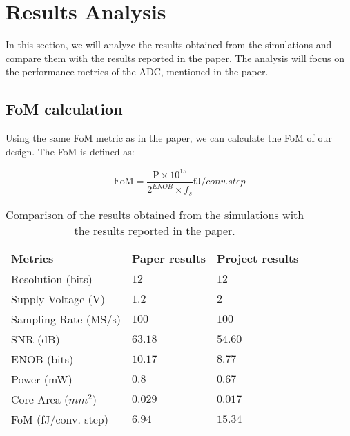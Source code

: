 \section{Results Analysis}
\label{sec:results}

In this section, we will analyze the results obtained from the simulations and compare them with the results reported in the paper. The analysis will focus on the performance metrics of the ADC, mentioned in the paper.

\subsection{FoM calculation}

Using the same FoM metric as in the paper, we can calculate the FoM of our design. The FoM is defined as:

\begin{equation}
    \text{FoM} = \frac{\text{P} \times 10^{15}}{2^{ENOB} \times f_s } \si{\femto \joule \per conv.step}
    \label{eq:FoM}
\end{equation}

\begin{table}[h]
    \centering
    \caption{Comparison of the results obtained from the simulations with the results reported in the paper.}
    \begin{tabularx}{\textwidth}{>{\centering\arraybackslash}X >{\centering\arraybackslash}X >{\centering\arraybackslash}X }
        \toprule
        \textbf{Metrics} & \textbf{Paper results} & \textbf{Project results}\\
        \midrule
        Resolution (bits) & $12$ & $12$ \\
        \midrule
        Supply Voltage (V) & $1.2$ & $2$ \\
        \midrule
        Sampling Rate (MS/s) & $100$ & $100$  \\
        \midrule
        SNR (dB) & $63.18$ & $54.60$ \\
        \midrule
        ENOB (bits) & $10.17$ & $8.77$ \\
        \midrule
        Power (mW) & $0.8$ & $0.67$   \\
        \midrule
        Core Area ($mm^2$) & $0.029$ & $0.017$   \\
        \midrule
        FoM (fJ/conv.-step) & $6.94$ & $15.34$  \\
        \bottomrule
    \end{tabularx}
    \label{tab:comparison_results}
\end{table}

